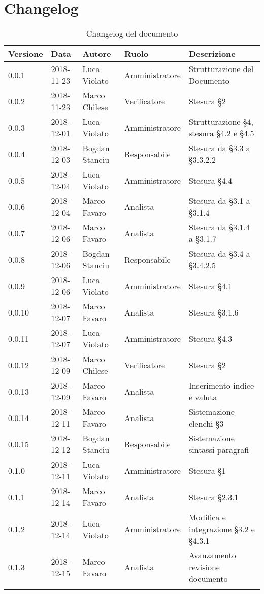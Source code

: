 \section{Changelog}

\begin{center}
\begin{longtable}[c]{|m{}|m{}|m{}|m{}|p{}|}
\hline
\textbf{Versione} & \textbf{Data} & \textbf{Autore} & \textbf{Ruolo} & \textbf{Descrizione} \\
\hline \hline
\endfirsthead
0.0.1 & 2018-11-23 & Luca Violato & Amministratore & Strutturazione del Documento \\
\hline
0.0.2 & 2018-11-23 & Marco Chilese & Verificatore & Stesura §2\\
\hline
0.0.3 & 2018-12-01 & Luca Violato & Amministratore & Strutturazione §4, stesura §4.2 e §4.5 \\
\hline
0.0.4 & 2018-12-03 & Bogdan Stanciu & Responsabile & Stesura da §3.3 a §3.3.2.2 \\
\hline
0.0.5 & 2018-12-04 & Luca Violato & Amministratore & Stesura §4.4 \\
\hline
0.0.6 & 2018-12-04 & Marco Favaro & Analista & Stesura da §3.1 a §3.1.4 \\
\hline
0.0.7 & 2018-12-06 & Marco Favaro & Analista & Stesura da §3.1.4 a §3.1.7 \\
\hline
0.0.8 & 2018-12-06 & Bogdan Stanciu & Responsabile & Stesura da §3.4 a §3.4.2.5 \\
\hline
0.0.9 & 2018-12-06 & Luca Violato & Amministratore & Stesura §4.1\\
\hline
0.0.10 & 2018-12-07 & Marco Favaro & Analista & Stesura §3.1.6\\
\hline
0.0.11 & 2018-12-07 & Luca Violato & Amministratore & Stesura §4.3\\
\hline
0.0.12 & 2018-12-09 & Marco Chilese & Verificatore & Stesura §2\\
\hline
0.0.13 & 2018-12-09 & Marco Favaro & Analista & Inserimento indice e valuta\\
\hline
0.0.14 & 2018-12-11 & Marco Favaro & Analista & Sistemazione elenchi §3\\
\hline
0.0.15 & 2018-12-12 & Bogdan Stanciu & Responsabile & Sistemazione sintassi paragrafi\\
\hline
0.1.0 & 2018-12-11 & Luca Violato & Amministratore & Stesura §1\\
\hline
0.1.1 & 2018-12-14 & Marco Favaro & Analista & Stesura §2.3.1\\
\hline
0.1.2 & 2018-12-14 & Luca Violato & Amministratore & Modifica e integrazione §3.2 e §4.3.1\\
\hline
0.1.3 & 2018-12-15 & Marco Favaro & Analista & Avanzamento revisione documento\\
\hline
\caption{Changelog del documento}
\end{longtable}
\end{center}